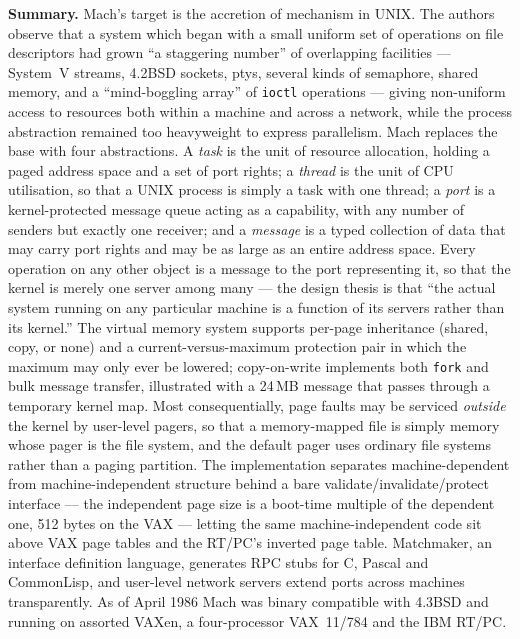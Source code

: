 \textbf{Summary.} Mach's target is the accretion of mechanism in UNIX. The authors observe
that a system which began with a small uniform set of operations on file descriptors had
grown ``a staggering number'' of overlapping facilities --- System~V streams, 4.2BSD
sockets, ptys, several kinds of semaphore, shared memory, and a ``mind-boggling array'' of
\texttt{ioctl} operations --- giving non-uniform access to resources both within a machine
and across a network, while the process abstraction remained too heavyweight to express
parallelism. Mach replaces the base with four abstractions. A \emph{task} is the unit of
resource allocation, holding a paged address space and a set of port rights; a \emph{thread}
is the unit of CPU utilisation, so that a UNIX process is simply a task with one thread; a
\emph{port} is a kernel-protected message queue acting as a capability, with any number of
senders but exactly one receiver; and a \emph{message} is a typed collection of data that may
carry port rights and may be as large as an entire address space. Every operation on any
other object is a message to the port representing it, so that the kernel is merely one
server among many --- the design thesis is that ``the actual system running on any particular
machine is a function of its servers rather than its kernel.'' The virtual memory system
supports per-page inheritance (shared, copy, or none) and a current-versus-maximum protection
pair in which the maximum may only ever be lowered; copy-on-write implements both
\texttt{fork} and bulk message transfer, illustrated with a 24\,MB message that passes
through a temporary kernel map. Most consequentially, page faults may be serviced
\emph{outside} the kernel by user-level pagers, so that a memory-mapped file is simply memory
whose pager is the file system, and the default pager uses ordinary file systems rather than
a paging partition. The implementation separates machine-dependent from machine-independent
structure behind a bare validate/invalidate/protect interface --- the independent page size
is a boot-time multiple of the dependent one, 512 bytes on the VAX --- letting the same
machine-independent code sit above VAX page tables and the RT/PC's inverted page table.
Matchmaker, an interface definition language, generates RPC stubs for C, Pascal and
CommonLisp, and user-level network servers extend ports across machines transparently.
As of April 1986 Mach was binary compatible with 4.3BSD and running on assorted VAXen, a
four-processor VAX~11/784 and the IBM RT/PC.

